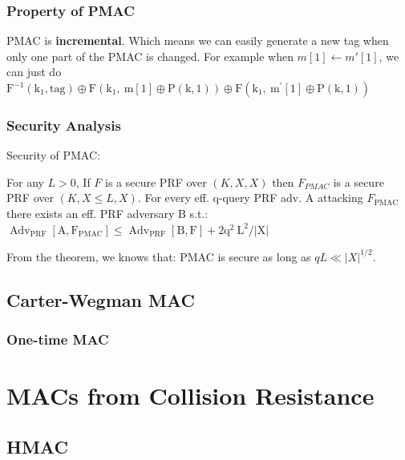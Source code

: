 \subsubsection{Property of PMAC}

PMAC is \textbf{incremental}. Which means we can easily generate a new tag when only one part of the PMAC is changed. For example when $m[1] \leftarrow m'[1]$, we can just do $\mathrm{F}^{-1}\left(\mathrm{k}_{1}, \mathrm{tag}\right) \oplus \mathrm{F}\left(\mathrm{k}_{1}, \mathrm{~m}[1] \oplus \mathrm{P}(\mathrm{k}, 1)\right) \oplus \mathrm{F}\left(\mathrm{k}_{1}, \mathrm{~m}^{\prime}[1] \oplus \mathrm{P}(\mathrm{k}, 1)\right)$


\subsubsection{Security Analysis}

\begin{theorem}  Security of PMAC:

    For any $L>0$,
    If $F$ is a secure PRF over $(K, X, X)$ then
    $F_{P M A C}$ is a secure PRF over $(K, X \leq L, X)$.
    For every eff. q-query PRF adv. A attacking $F_{\text {PMAC }}$ there exists an eff. PRF adversary B s.t.:
    $\operatorname{Adv}_{\mathrm{PRF}}\left[\mathrm{A}, \mathrm{F}_{\mathrm{PMAC}}\right] \leq \operatorname{Adv}_{\mathrm{PRF}}[\mathrm{B}, \mathrm{F}]+2 \mathrm{q}^{2} \mathrm{~L}^{2} /|\mathrm{X}|$
    
\end{theorem}


From the theorem, we knows that: PMAC is secure as long as $q L \ll|X|^{1 / 2}$.


\subsection{Carter-Wegman MAC}

\subsubsection{One-time MAC}



\section{MACs from Collision Resistance}

\subsection{HMAC}

